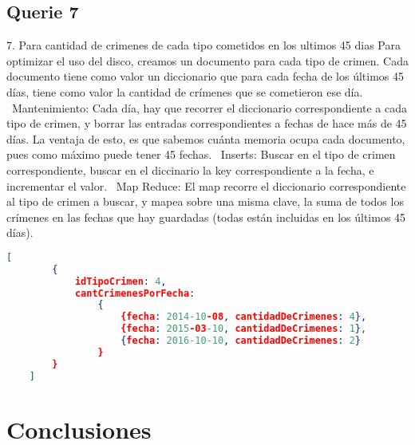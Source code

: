 \documentclass[11pt, a4paper]{article}
\begin{document}
\subsection{Querie 7}
7. Para cantidad de crimenes de cada tipo cometidos en los ultimos 45 dias
Para optimizar el uso del disco, creamos un documento para cada tipo de crimen. Cada documento tiene como valor un diccionario que para cada fecha de los últimos 45 días, tiene como valor la cantidad de crímenes que se cometieron ese día. \
Mantenimiento: Cada día, hay que recorrer el diccionario correspondiente a cada tipo de crimen, y borrar las entradas correspondientes a fechas de hace más de 45 días. La ventaja de esto, es que sabemos cuánta memoria ocupa cada documento, pues como máximo puede tener 45 fechas. \
Inserts: Buscar en el tipo de crimen correspondiente, buscar en el diccinario la key correspondiente a la fecha, e incrementar el valor. \
Map Reduce: El map recorre el diccionario correspondiente al tipo de crimen a buscar, y mapea sobre una misma clave, la suma de todos los crímenes en las fechas que hay guardadas (todas están incluidas en los últimos 45 días). \
\begin{lstlisting}[language=json]
	[
		{
			idTipoCrimen: 4,
			cantCrimenesPorFecha:
				{
					{fecha: 2014-10-08, cantidadDeCrimenes: 4},
					{fecha: 2015-03-10, cantidadDeCrimenes: 1},
					{fecha: 2016-10-10, cantidadDeCrimenes: 2}
				}
		}
	]
\end{lstlisting}

\section{Conclusiones}
\end{document}
